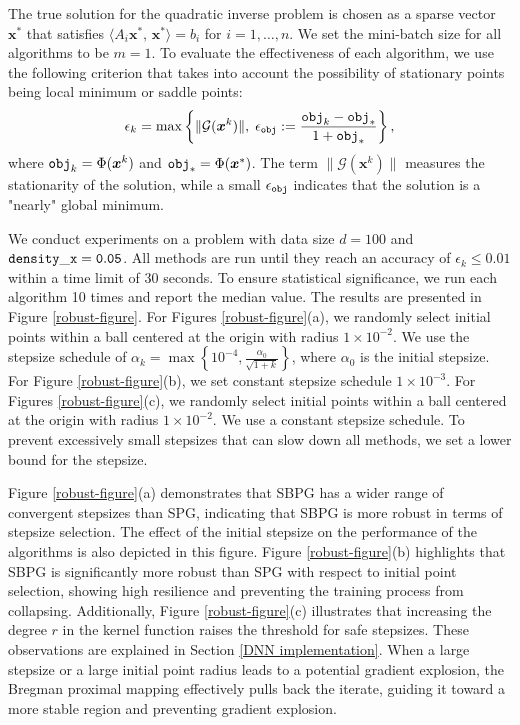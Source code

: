\documentclass[twoside,11pt]{article}
\newcommand{\cG}{\mathcal G}
\def\inprod#1#2{\langle#1,\,#2\rangle}
\def\eps{\epsilon}
\def\vx{{\bm{x}}}
\begin{document}
The true solution for the quadratic inverse problem is chosen as a sparse vector $\vx^*$ that satisfies $\inprod{A_i\vx^*}{\vx^*}=b_i$ for $i=1,\dots,n$. We set the mini-batch size for all algorithms to be $m=1$. To evaluate the effectiveness of each algorithm, we use the following criterion that takes into account the possibility of stationary points being local minimum or saddle points:
\begin{equation}
\epsilon_k=\max\left\{\|\cG({\vx^k})\|,\;\epsilon_{\tt obj}:=\frac{{\tt obj}_k-{\tt obj}_*}{1+{\tt obj}_*}\right\},
\label{eq:exp-qip-stationarity}
\end{equation}
 where ${\tt obj}_k=\Phi({\vx^k})$ and ${\tt obj}_*=\Phi(\vx^*)$. The term $\|\cG(\vx^k)\|$ measures the stationarity of the solution, while a small $\eps_{\tt obj}$ indicates that the solution is a "nearly" global minimum.

We conduct experiments on a problem with data size $d=100$ and ${\tt density\_x=0.05}$. All methods are run until they reach an accuracy of $\epsilon_k\leq0.01$ within a time limit of 30 seconds. To ensure statistical significance, we run each algorithm 10 times and report the median value. The results are presented in Figure \ref{robust-figure}. For Figures \ref{robust-figure}(a), we randomly select initial points within a ball centered at the origin with radius $1\times10^{-2}$. We use the stepsize schedule of $\alpha_k=\max\left\{10^{-4},\frac{\alpha_0}{\sqrt{1+k}}\right\}$, where $\alpha_0$ is the initial stepsize. For Figure \ref{robust-figure}(b), we set constant stepsize schedule $1\times10^{-3}$. For Figures \ref{robust-figure}(c), we randomly select initial points within a ball centered at the origin with radius $1\times10^{-2}$. We use a constant stepsize schedule. To prevent excessively small stepsizes that can slow down all methods, we set a lower bound for the stepsize.

Figure \ref{robust-figure}(a) demonstrates that SBPG has a wider range of convergent stepsizes than SPG, indicating that SBPG is more robust in terms of stepsize selection. The effect of the initial stepsize on the performance of the algorithms is also depicted in this figure. Figure \ref{robust-figure}(b) highlights that SBPG is significantly more robust than SPG with respect to initial point selection, showing high resilience and preventing the training process from collapsing. Additionally, Figure \ref{robust-figure}(c) illustrates that increasing the degree $r$ in the kernel function raises the threshold for safe stepsizes. These observations are explained in Section \ref{DNN implementation}. When a large stepsize or a large initial point radius leads to a potential gradient explosion, the Bregman proximal mapping effectively pulls back the iterate, guiding it toward a more stable region and preventing gradient explosion.
\end{document}
